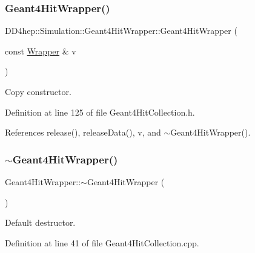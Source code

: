 \subsubsection{\texorpdfstring{Geant4\+Hit\+Wrapper()}{Geant4HitWrapper()}\hspace{0.1cm}{\footnotesize\ttfamily [3/3]}}
{\footnotesize\ttfamily D\+D4hep\+::\+Simulation\+::\+Geant4\+Hit\+Wrapper\+::\+Geant4\+Hit\+Wrapper (\begin{DoxyParamCaption}\item[{const \hyperlink{class_d_d4hep_1_1_simulation_1_1_geant4_hit_wrapper_a4779e35eba7d553e0f2d497c49a42ec6}{Wrapper} \&}]{v }\end{DoxyParamCaption})\hspace{0.3cm}{\ttfamily [inline]}}



Copy constructor. 



Definition at line 125 of file Geant4\+Hit\+Collection.\+h.



References release(), release\+Data(), v, and $\sim$\+Geant4\+Hit\+Wrapper().

\hypertarget{class_d_d4hep_1_1_simulation_1_1_geant4_hit_wrapper_ae5a3a00858bb69ec71673f7286be2bab}{}\label{class_d_d4hep_1_1_simulation_1_1_geant4_hit_wrapper_ae5a3a00858bb69ec71673f7286be2bab} 
\subsubsection{\texorpdfstring{$\sim$\+Geant4\+Hit\+Wrapper()}{~Geant4HitWrapper()}}
{\footnotesize\ttfamily Geant4\+Hit\+Wrapper\+::$\sim$\+Geant4\+Hit\+Wrapper (\begin{DoxyParamCaption}{ }\end{DoxyParamCaption})\hspace{0.3cm}{\ttfamily [virtual]}}



Default destructor. 



Definition at line 41 of file Geant4\+Hit\+Collection.\+cpp.



